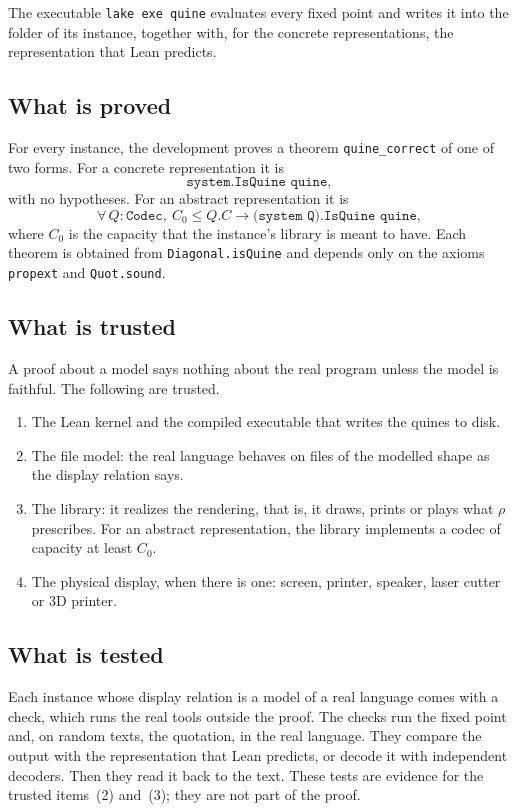 \documentclass[11pt]{amsart}
\theoremstyle{definition}
\theoremstyle{remark}
\newcommand{\rend}{\rho}
\newcommand{\lean}[1]{\texttt{#1}}
\begin{document}
The executable \lean{lake exe quine} evaluates every fixed point and writes it into the folder of
its instance, together with, for the concrete representations, the representation that Lean
predicts.

\subsection{What is proved}

For every instance, the development proves a theorem \lean{quine\_correct} of one of two forms.
For a concrete representation it is
\[
  \lean{system.IsQuine quine},
\]
with no hypotheses. For an abstract representation it is
\[
  \forall\, Q : \lean{Codec},\ C_0 \le Q.C \to \lean{(system Q).IsQuine quine},
\]
where $C_0$ is the capacity that the instance's library is meant to have. Each theorem is obtained
from \lean{Diagonal.isQuine} and depends only on the axioms \lean{propext} and \lean{Quot.sound}.

\subsection{What is trusted}

A proof about a model says nothing about the real program unless the model is faithful. The
following are trusted.
\begin{enumerate}
\item The Lean kernel and the compiled executable that writes the quines to disk.
\item The file model: the real language behaves on files of the modelled shape as the display
relation says.
\item The library: it realizes the rendering, that is, it draws, prints or plays what $\rend$
prescribes. For an abstract representation, the library implements a codec of capacity at least
$C_0$.
\item The physical display, when there is one: screen, printer, speaker, laser cutter or 3D printer.
\end{enumerate}

\subsection{What is tested}

Each instance whose display relation is a model of a real language comes with a check, which runs
the real tools outside the proof. The checks run the fixed point and, on random texts, the
quotation, in the real language. They compare the output with
the representation that Lean predicts, or decode it with independent decoders. Then they read it
back to the text. These tests are evidence for the trusted items~(2) and~(3); they are not part of
the
proof.
\end{document}

